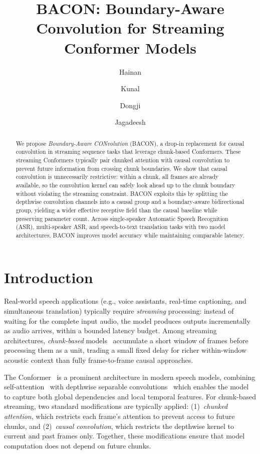 \documentclass[cameraready]{Interspeech}
\title{BACON: Boundary-Aware Convolution for Streaming Conformer Models}
\author{Hainan}{Xu}
\author{Kunal}{Dhawan}
\author{Dongji}{Gao}
\author{Jagadeesh}{Balam}
\begin{document}
\maketitle

\begin{abstract}
We propose \emph{Boundary-Aware CONvolution} (BACON), a drop-in replacement for causal convolution in streaming sequence tasks that leverage chunk-based Conformers.
These streaming Conformers typically pair chunked attention with
causal convolution to prevent future information from crossing chunk
boundaries. We show that
causal convolution is unnecessarily restrictive: within a chunk, all frames
are already available, so the convolution kernel can safely look ahead up to
the chunk boundary without violating the streaming constraint.
BACON exploits
this by splitting the depthwise convolution channels into a causal group and a
boundary-aware bidirectional group, yielding a wider effective receptive field
than the causal baseline while preserving parameter count.
Across single-speaker Automatic Speech Recognition (ASR), multi-speaker ASR, and speech-to-text translation tasks with two model architectures,
BACON improves model accuracy while maintaining comparable latency.

\end{abstract}

\section{Introduction}
\label{sec:intro}

Real-world speech applications (e.g., voice assistants, real-time captioning,
and simultaneous translation) typically require \emph{streaming} processing:
instead of waiting for the complete input audio, the model produces outputs
incrementally as
audio arrives, within a bounded latency budget. 
Among streaming architectures,
\emph{chunk-based} models~\cite{chen2021developing} accumulate a short window
of frames before processing them as a unit, trading a small fixed delay for
richer within-window acoustic context than fully frame-to-frame causal approaches.

The Conformer~\cite{gulati2020conformer,rekesh2023fast} is a prominent architecture in modern
speech models, combining self-attention~\cite{vaswani2017attention} with
depthwise separable convolutions~\cite{kaiser2017depthwise} which enables the model to capture both global dependencies and local temporal features.
For chunk-based streaming, two standard modifications are typically applied: (1)~\emph{chunked
attention}, which restricts each frame's attention
to prevent access to future chunks, and (2)~\emph{causal convolution}, which
restricts the depthwise kernel to current and past frames only. 
Together, these modifications ensure that model computation does not depend on future chunks.
\end{document}
